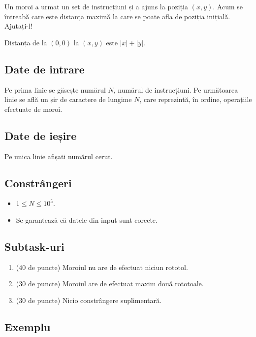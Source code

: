 \documentclass[12pt,a4paper]{article}
\begin{document}
\vspace{1em}

Un moroi a urmat un set de instrucțiuni și a ajuns la poziția $(x, y)$. Acum se întreabă care este distanța maximă la care se poate afla de poziția inițială. Ajutați-l! 

Distanța de la $(0, 0)$ la $(x, y)$ este $|x| + |y|$.

\subsection*{Date de intrare}

Pe prima linie se găsește numărul $N$, numărul de instrucțiuni.
Pe următoarea linie se află un șir de caractere de lungime $N$, care reprezintă, în ordine, operațiile efectuate de moroi.

\subsection*{Date de ieșire}

Pe unica linie afișati numărul cerut.

\subsection*{Constrângeri}

\begin{itemize}
    \item $1 \leq N \leq 10^5$.
    \item Se garantează că datele din input sunt corecte.
\end{itemize}


\subsection*{Subtask-uri}

\begin{enumerate}
    \item ($40$ de puncte) Moroiul nu are de efectuat niciun rototol.
    \item ($30$ de puncte) Moroiul are de efectuat maxim două rototoale.
    \item ($30$ de puncte) Nicio constrângere suplimentară.
\end{enumerate}

\subsection*{Exemplu}
\end{document}

